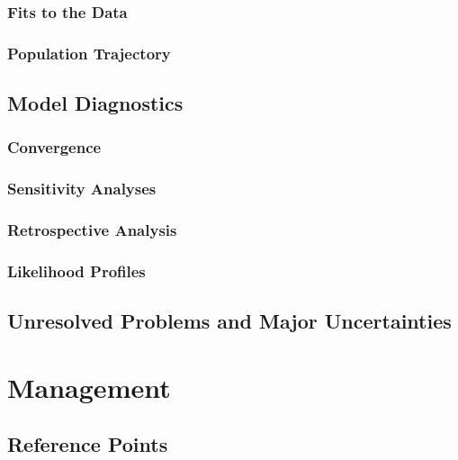 \documentclass[
]{scrartcl}
\begin{document}
\subsubsection{Fits to the Data}\label{fits-to-the-data}

\subsubsection{Population Trajectory}\label{population-trajectory}

\newpage{}

\subsection{Model Diagnostics}\label{model-diagnostics}

\subsubsection{Convergence}\label{convergence}

\subsubsection{Sensitivity Analyses}\label{sensitivity-analyses}

\subsubsection{Retrospective Analysis}\label{retrospective-analysis}

\subsubsection{Likelihood Profiles}\label{likelihood-profiles}

\subsection{Unresolved Problems and Major
Uncertainties}\label{unresolved-problems-and-major-uncertainties-1}

\newpage{}

\section{Management}\label{management}

\subsection{Reference Points}\label{reference-points-1}
\end{document}
